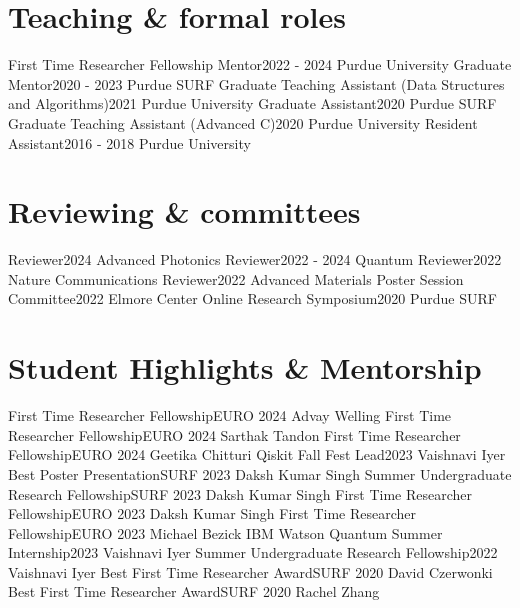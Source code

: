 \section{Teaching \& formal roles}
  \resumeSubHeadingListStart
    \resumeSubheading
      {First Time Researcher Fellowship Mentor}{2022 - 2024}
      {Purdue University}{}
    \resumeSubheading
      {Graduate Mentor}{2020 - 2023}
      {Purdue SURF}{}
    \resumeSubheading
      {Graduate Teaching Assistant (Data Structures and Algorithms)}{2021}
      {Purdue University}{}
    \resumeSubheading
      {Graduate Assistant}{2020}
      {Purdue SURF}{}
    \resumeSubheading
      {Graduate Teaching Assistant (Advanced C)}{2020}
      {Purdue University}{}
    \resumeSubheading
      {Resident Assistant}{2016 - 2018}
      {Purdue University}{}
  \resumeSubHeadingListEnd
\section{Reviewing \& committees}
  \resumeSubHeadingListStart
    \resumeSubheading
      {Reviewer}{2024}
      {Advanced Photonics}{}
    \resumeSubheading
      {Reviewer}{2022 - 2024}
      {Quantum}{}
    \resumeSubheading
      {Reviewer}{2022}
      {Nature Communications}{}
    \resumeSubheading
      {Reviewer}{2022}
      {Advanced Materials}{}
    \resumeSubheading
      {Poster Session Committee}{2022}
      {Elmore Center}{}
    \resumeSubheading
      {Online Research Symposium}{2020}
      {Purdue SURF}{}
  \resumeSubHeadingListEnd
\section{Student Highlights \& Mentorship}
  \resumeSubHeadingListStart
    \resumeSubheading
      {First Time Researcher Fellowship}{EURO 2024}
      {Advay Welling}{}
    \resumeSubheading
      {First Time Researcher Fellowship}{EURO 2024}
      {Sarthak Tandon}{}
    \resumeSubheading
      {First Time Researcher Fellowship}{EURO 2024}
      {Geetika Chitturi}{}
    \resumeSubheading
      {Qiskit Fall Fest Lead}{2023}
      {Vaishnavi Iyer}{}
    \resumeSubheading
      {Best Poster Presentation}{SURF 2023}
      {Daksh Kumar Singh}{}
    \resumeSubheading
      {Summer Undergraduate Research Fellowship}{SURF 2023}
      {Daksh Kumar Singh}{}
    \resumeSubheading
      {First Time Researcher Fellowship}{EURO 2023}
      {Daksh Kumar Singh}{}
    \resumeSubheading
      {First Time Researcher Fellowship}{EURO 2023}
      {Michael Bezick}{}
    \resumeSubheading
      {IBM Watson Quantum Summer Internship}{2023}
      {Vaishnavi Iyer}{}
    \resumeSubheading
      {Summer Undergraduate Research Fellowship}{2022}
      {Vaishnavi Iyer}{}
    \resumeSubheading
      {Best First Time Researcher Award}{SURF 2020}
      {David Czerwonki}{}
    \resumeSubheading
      {Best First Time Researcher Award}{SURF 2020}
      {Rachel Zhang}{}
  \resumeSubHeadingListEnd
